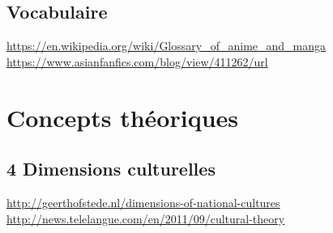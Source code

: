 \subsection{Vocabulaire}
\noindent
\url{https://en.wikipedia.org/wiki/Glossary_of_anime_and_manga}\\
\url{https://www.asianfanfics.com/blog/view/411262/url}

\section{Concepts théoriques}
\subsection{4 Dimensions culturelles}
\noindent
\url{http://geerthofstede.nl/dimensions-of-national-cultures}\\
\url{http://news.telelangue.com/en/2011/09/cultural-theory}
